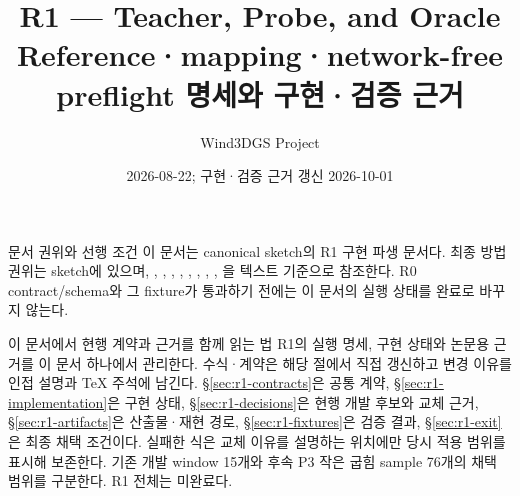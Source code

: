 \documentclass[10pt]{article}
\title{\textbf{R1 --- Teacher, Probe, and Oracle}\\
Reference·mapping·network-free preflight 명세와 구현·검증 근거}
\author{Wind3DGS Project}
\date{2026-08-22; 구현·검증 근거 갱신 2026-10-01}
\begin{document}
\maketitle

\begin{contractbox}{문서 권위와 선행 조건}
이 문서는 canonical sketch의 R1 구현 파생 문서다. 최종 방법 권위는 sketch에 있으며,
, ,
, ,
, ,
, ,
을 텍스트 기준으로 참조한다.
R0 contract/schema와 그 fixture가 통과하기 전에는 이 문서의 실행 상태를 완료로 바꾸지 않는다.
\end{contractbox}

\begin{contractbox}{이 문서에서 현행 계약과 근거를 함께 읽는 법}
R1의 실행 명세, 구현 상태와 논문용 근거를 이 문서 하나에서 관리한다.
수식·계약은 해당 절에서 직접 갱신하고 변경 이유를 인접 설명과 TeX 주석에 남긴다.
\S\ref{sec:r1-contracts}은 공통 계약, \S\ref{sec:r1-implementation}은 구현 상태,
\S\ref{sec:r1-decisions}은 현행 개발 후보와 교체 근거,
\S\ref{sec:r1-artifacts}은 산출물·재현 경로,
\S\ref{sec:r1-fixtures}은 검증 결과, \S\ref{sec:r1-exit}은 최종 채택 조건이다.
실패한 식은 교체 이유를 설명하는 위치에만 당시 적용 범위를 표시해 보존한다.
기존 개발 window 15개와 후속 P3 작은 굽힘 sample 76개의 채택 범위를 구분한다. R1 전체는 미완료다.
\end{contractbox}
\end{document}
